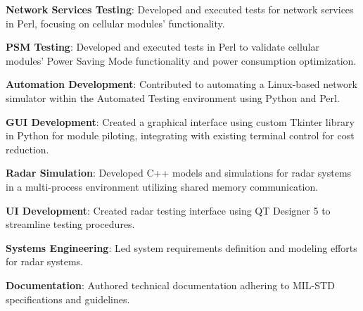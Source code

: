 \documentclass{dske-resume-openfont}
\begin{document}
\begin{minipage}[t]{0.62\textwidth} 


\vspace{\topsep}
\begin{tightemize}
\item \textbf{Network Services Testing}: Developed and executed tests for network services in Perl, focusing on cellular modules' functionality.
\item \textbf{PSM Testing}: Developed and executed tests in Perl to validate cellular modules' Power Saving Mode functionality and power consumption optimization.
\item \textbf{Automation Development}: Contributed to automating a Linux-based network simulator within the Automated Testing environment using Python and Perl.
\item \textbf{GUI Development}: Created a graphical interface using custom Tkinter library in Python for module piloting, integrating with existing terminal control for cost reduction.
\end{tightemize}
\sectionsep{}

\vspace{\topsep} %
\begin{tightemize}
\item \textbf{Radar Simulation}: Developed C++ models and simulations for radar systems in a multi-process environment utilizing shared memory communication.
\item \textbf{UI Development}: Created radar testing interface using QT Designer 5 to streamline testing procedures.
\item \textbf{Systems Engineering}: Led system requirements definition and modeling efforts for radar systems.
\item \textbf{Documentation}: Authored technical documentation adhering to MIL-STD specifications and guidelines.
\end{tightemize}

\sectionsep{}


\end{minipage}
\end{document}
